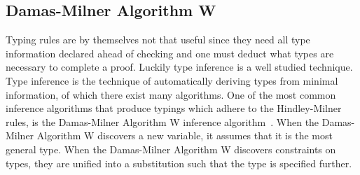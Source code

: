 \documentclass[11pt,oneside,a4paper]{report}
\begin{document}



\subsection{Damas-Milner Algorithm W}
\label{subsec:algw}
Typing rules are by themselves not that useful since they need all type information declared ahead of checking and one must deduct what types are necessary to complete a proof.
Luckily type inference is a well studied technique.
Type inference is the technique of automatically deriving types from minimal information, of which there exist many algorithms.
One of the most common inference algorithms that produce typings which adhere to the Hindley-Milner rules, is the Damas-Milner Algorithm W inference algorithm~\cite{damas1984type,damas1982principal}.
When the Damas-Milner Algorithm W discovers a new variable, it assumes that it is the most general type.
When the Damas-Milner Algorithm W discovers constraints on types, they are unified into a substitution such that the type is specified further.
\end{document}
